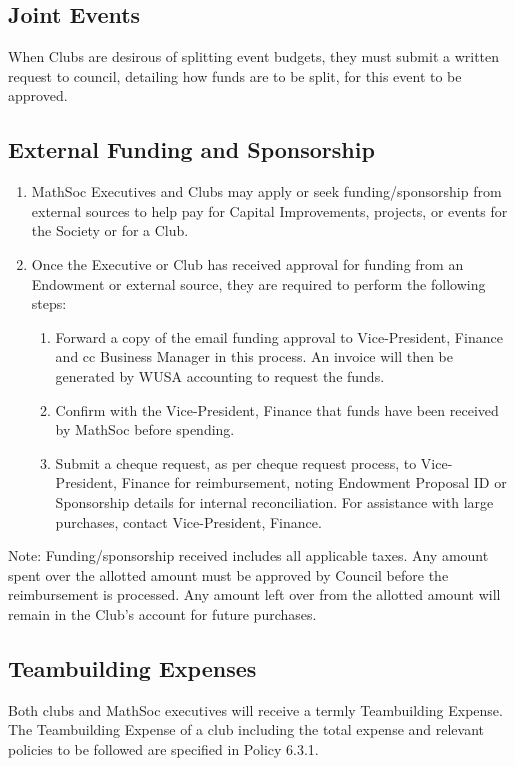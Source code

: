 \subsection{Joint Events}
When Clubs are desirous of splitting event budgets, they must submit a written request to council, detailing how funds are to be split, for this event to be approved.

\subsection{External Funding and Sponsorship}
\begin{enumerate}
    \item MathSoc Executives and Clubs may apply or seek funding/sponsorship from external sources to help pay for Capital Improvements, projects, or events for the Society or for a Club.
    \item Once the Executive or Club has received approval for funding from an Endowment or external source, they are required to perform the following steps:
    \begin{enumerate}
        \item Forward a copy of the email funding approval to Vice-President, Finance and cc Business Manager in this process. An invoice will then be generated by WUSA accounting to request the funds.
        \item Confirm with the Vice-President, Finance that funds have been received by MathSoc before spending. 
        \item Submit a cheque request, as per cheque request process, to Vice-President, Finance for reimbursement, noting Endowment Proposal ID or Sponsorship details for internal reconciliation. For assistance with large purchases, contact Vice-President, Finance.
    \end{enumerate}
\end{enumerate}
Note: Funding/sponsorship received includes all applicable taxes. Any amount spent over the allotted amount must be approved by Council before the reimbursement is processed. Any amount left over from the allotted amount will remain in the Club's account for future purchases.

\subsection{Teambuilding Expenses}
Both clubs and MathSoc executives will receive a termly Teambuilding Expense. The Teambuilding Expense of a club including the total expense and relevant policies to be followed are specified in Policy 6.3.1.

